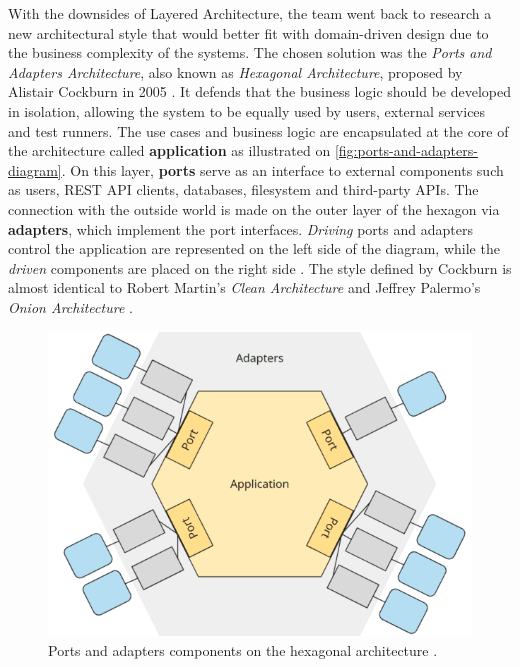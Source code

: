 With the downsides of Layered Architecture, the team went back to research a new architectural style that would better fit with domain-driven design due to the business complexity of the systems. The chosen solution was the \textit{Ports and Adapters Architecture}, also known as \textit{Hexagonal Architecture}, proposed by Alistair Cockburn in 2005 \cite{alistair-cockburn-hexagonal-architecture}. It defends that the business logic should be developed in isolation, allowing the system to be equally used by users, external services and test runners. The use cases and business logic are encapsulated at the core of the architecture called \textbf{application} as illustrated on \autoref{fig:ports-and-adapters-diagram}. On this layer, \textbf{ports} serve as an interface to external components such as users, REST API clients, databases, filesystem and third-party APIs. The connection with the outside world is made on the outer layer of the hexagon via \textbf{adapters}, which implement the port interfaces. \textit{Driving} ports and adapters control the application are represented on the left side of the diagram, while the \textit{driven} components are placed on the right side \cite{sven-woltmann-hexagonal-architecture}. The style defined by Cockburn is almost identical to Robert Martin's \textit{Clean Architecture} \cite{robert-martin-clean-architecture-book} and Jeffrey Palermo's \textit{Onion Architecture} \cite{onion-architecture-article}.

\begin{figure}[htbp]
  \centering
  \includegraphics[scale=0.5]{Imagens/chap04/ports-and-adapters-diagram.png}
  \caption{Ports and adapters components on the hexagonal architecture \cite{sven-woltmann-hexagonal-architecture}.}
  \label{fig:ports-and-adapters-diagram}
\end{figure}

